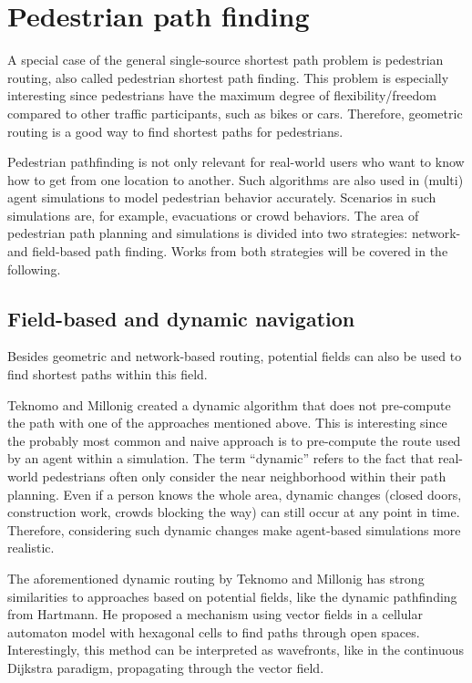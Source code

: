 \section{Pedestrian path finding}
\label{sec:pedestrian-path-planning}
	
	A special case of the general single-source shortest path problem is pedestrian routing, also called pedestrian shortest path finding.
	This problem is especially interesting since pedestrians have the maximum degree of flexibility/freedom compared to other traffic participants, such as bikes or cars.
	Therefore, geometric routing is a good way to find shortest paths for pedestrians.
	
	Pedestrian pathfinding is not only relevant for real-world users who want to know how to get from one location to another.
	Such algorithms are also used in (multi) agent simulations to model pedestrian behavior accurately.
	Scenarios in such simulations are, for example, evacuations or crowd behaviors.
	The area of pedestrian path planning and simulations is divided into two strategies: network- and field-based path finding\cite{hartmann-geodesic}.
	Works from both strategies will be covered in the following.
	
	\subsection{Field-based and dynamic navigation}
	\label{subsec:field-based-routing}
	
		Besides geometric and network-based routing, potential fields can also be used to find shortest paths within this field.
		
		Teknomo and Millonig created a dynamic algorithm that does not pre-compute the path with one of the approaches mentioned above\cite{teknomo-millonig-routing}.
		This is interesting since the probably most common and naive approach is to pre-compute the route used by an agent within a simulation.
		The term \enquote{dynamic} refers to the fact that real-world pedestrians often only consider the near neighborhood within their path planning.
		Even if a person knows the whole area, dynamic changes (closed doors, construction work, crowds blocking the way) can still occur at any point in time.
		Therefore, considering such dynamic changes make agent-based simulations more realistic.
		
		The aforementioned dynamic routing by Teknomo and Millonig has strong similarities to approaches based on potential fields, like the dynamic pathfinding from Hartmann\cite{hartmann-geodesic}.
		He proposed a mechanism using vector fields in a cellular automaton model with hexagonal cells to find paths through open spaces.
		Interestingly, this method can be interpreted as wavefronts, like in the continuous Dijkstra paradigm, propagating through the vector field.
			
